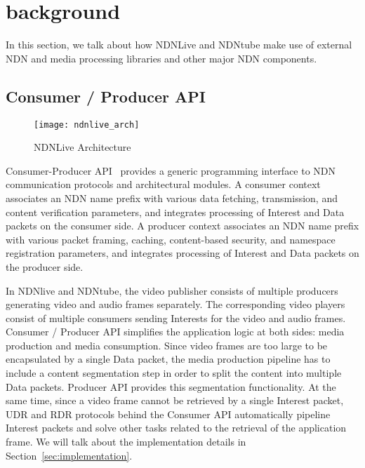 


\section{background} %
In this section, we talk about how NDNLive and NDNtube make use of external NDN and media processing libraries and other major NDN components. 

\label{sec:background}
\subsection{Consumer / Producer API}
\label{ssub:cpapi}

\begin{figure*}
  \centering
  \texttt{[image: ndnlive\_arch]}
  \caption{NDNLive Architecture}
  \label{fig:ndnlive_arch}
\end{figure*}

Consumer-Producer API~\cite{api-tr} provides a generic programming interface to NDN communication protocols and architectural modules. A consumer context associates an NDN name prefix with various data fetching, transmission, and content verification parameters, and integrates processing of Interest and Data packets on the consumer side. A producer context associates an NDN name prefix with various packet framing, caching, content-based security, and namespace registration parameters, and integrates processing of Interest and Data packets on the producer side.

In NDNlive and NDNtube, the video publisher consists of multiple producers generating video and audio frames separately. The corresponding video players consist of multiple consumers sending Interests for the video and audio frames. Consumer / Producer API simplifies the application logic at both sides: media production and media consumption. Since video frames are too large to be encapsulated by a single Data packet, the media production pipeline has to include a content segmentation step in order to split the content into multiple Data packets. Producer API provides this segmentation functionality. At the same time, since a video frame cannot be retrieved by a single Interest packet, UDR and RDR protocols behind the Consumer API automatically pipeline Interest packets and solve other tasks related to the retrieval of the application frame. 
We will talk about the implementation details in Section~\ref{sec:implementation}.

